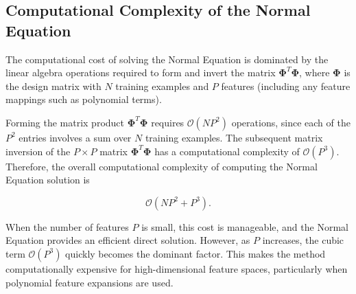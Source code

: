 \documentclass{article}
\begin{document}






\subsection{Computational Complexity of the Normal Equation}

The computational cost of solving the Normal Equation is dominated by the linear algebra operations required to form and invert the matrix $\boldsymbol{\Phi}^T \boldsymbol{\Phi}$, where $\boldsymbol{\Phi}$ is the design matrix with $N$ training examples and $P$ features (including any feature mappings such as polynomial terms).

Forming the matrix product $\boldsymbol{\Phi}^T \boldsymbol{\Phi}$ requires $\mathcal{O}(N P^2)$ operations, since each of the $P^2$ entries involves a sum over $N$ training examples. The subsequent matrix inversion of the $P \times P$ matrix $\boldsymbol{\Phi}^T \boldsymbol{\Phi}$ has a computational complexity of $\mathcal{O}(P^3)$. Therefore, the overall computational complexity of computing the Normal Equation solution is

\[
\mathcal{O}(N P^2 + P^3).
\]

When the number of features $P$ is small, this cost is manageable, and the Normal Equation provides an efficient direct solution. However, as $P$ increases, the cubic term $\mathcal{O}(P^3)$ quickly becomes the dominant factor. This makes the method computationally expensive for high-dimensional feature spaces, particularly when polynomial feature expansions are used.
\end{document}
